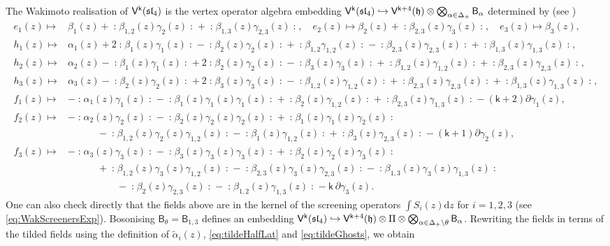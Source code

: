 \documentclass[10pt,a4paper]{amsart}
\numberwithin{equation}{section}
\newcommand{\dd}{\mathrm{d}}   %
\newcommand{\kk}{\mathsf{k}}   %
\DeclarePairedDelimiter{\brac}{\lparen}{\rparen}   %
\newcommand{\no}[1]{\mathopen{:} #1 \mathclose{:}} %
\newcommand{\alg}[1]{\mathfrak{#1}}  %
\newcommand{\VOA}[1]{\mathsf{#1}}    %
\newcommand{\SLA}[2]{\alg{#1}_{#2}}                      %
\newcommand{\slfour}{\SLA{sl}{4}}
\newcommand{\proots}{\Delta_+}                                       %
\newcommand{\uaffvoa}[2]{\VOA{V}^{#1}\brac{#2}}                   %
\newcommand{\bgvoa}{\VOA{B}}                                      %
\theoremstyle{plain}
\begin{document}
The Wakimoto realisation of $\uaffvoa{\kk}{\slfour}$ is the vertex operator algebra embedding $\uaffvoa{\kk}{\slfour} \hookrightarrow \uaffvoa{\kk+4}{\mathfrak{h}}\otimes \bigotimes_{\alpha \in \proots} \bgvoa_\alpha$ determined by (see \cite[Thm.~5.1]{Fre05Opers})
%
\begin{equation}
\begin{aligned}
    e_1(z) \mapsto& \beta_1(z) + \no{\beta_{1,2}(z) \gamma_2(z)} + \no{\beta_{1,3}(z) \gamma_{2,3}(z)}, \quad 
    e_2(z) \mapsto \beta_2(z) + \no{\beta_{2,3}(z) \gamma_3(z)}, \quad
    e_3(z) \mapsto \beta_3(z),\\
    h_1(z) \mapsto& \alpha_1(z) + 2 \no{\beta_1(z) \gamma_1(z)}- \no{\beta_2(z) \gamma_2(z)}  + \no{\beta_{1,2} \gamma_{1,2}(z)}- \no{\beta_{2,3}(z) \gamma_{2,3}(z)} +     \no{\beta_{1,3}(z) \gamma_{1,3}(z)} , \\
    h_2(z) \mapsto& \alpha_2(z) - \no{\beta_1(z) \gamma_1(z)}+  2 \no{\beta_2(z) \gamma_2(z)} - \no{\beta_3(z) \gamma_3(z)} + \no{\beta_{1,2}(z) \gamma_{1,2}(z)} +       \no{\beta_{2,3}(z) \gamma_{2,3}(z)},\\
    h_3(z) \mapsto& \alpha_3(z)- \no{\beta_2(z) \gamma_2(z)} + 2 \no{\beta_3(z) \gamma_3(z)} - \no{\beta_{1,2}(z) \gamma_{1,2}(z)}  + \no{\beta_{2,3}(z)   \gamma_{2,3}(z)} + \no{\beta_{1,3}(z) \gamma_{1,3}(z)},\\
    f_1(z) \mapsto& -\no{\alpha_1(z) \gamma_1(z)} - \no{\beta_1(z)\gamma_1(z) \gamma_1(z)} + \no{\beta_2(z) \gamma_{1,2}(z)} + \no{\beta_{2,3}(z) \gamma_{1,3}(z)} - (\kk+2) \partial\gamma_1(z),\\ 
    f_2(z) \mapsto&  - \no{\alpha_2(z) \gamma_2(z)} - \no{\beta_2(z)\gamma_2(z) \gamma_2(z)}+ \no{\beta_1(z) \gamma_1(z) \gamma_2(z)}  \\
        &\hspace{3em} - \no{\beta_{1,2}(z) \gamma_2(z) \gamma_{1,2}(z)}- \no{\beta_1(z)\gamma_{1,2}(z)}  + \no{\beta_3(z) \gamma_{2,3}(z)} - (\kk+1) \partial \gamma_2(z),\\
    f_3(z) \mapsto& -\no{\alpha_3(z) \gamma_3(z)} - \no{\beta_3(z)\gamma_3(z) \gamma_3(z)}+ \no{\beta_2(z) \gamma_2(z) \gamma_3(z)} \\
        &\hspace{3em} +\no{\beta_{1,2}(z) \gamma_3(z) \gamma_{1,2}(z)}- \no{\beta_{2,3}(z) \gamma_3(z) \gamma_{2,3}(z)}-\no{\beta_{1,3}(z) \gamma_3(z) \gamma_{1,3}(z)}  \\
        &\hspace{5em} - \no{\beta_2(z) \gamma_{2,3}(z)}- \no{\beta_{1,2}(z) \gamma_{1,3}(z)}  - \kk\ \partial \gamma_3(z).
\end{aligned}
\end{equation}
%
One can also check directly that the fields above are in the kernel of the screening operators $\int S_i(z) \dd z$ for $i=1,2,3$ (see \eqref{eq:WakScreenersExp}). Bosonising $\bgvoa_\theta = \bgvoa_{1,3}$ defines an embedding $\uaffvoa{\kk}{\slfour} \hookrightarrow \uaffvoa{\kk+4}{\mathfrak{h}}\otimes \Pi \otimes \bigotimes_{\alpha \in \proots \setminus \theta} \bgvoa_\alpha$. Rewriting the fields in terms of
the tilded fields using the definition of $\tilde{\alpha}_i(z)$, \eqref{eq:tildeHalfLat} and \eqref{eq:tildeGhosts}, we obtain
\end{document}
